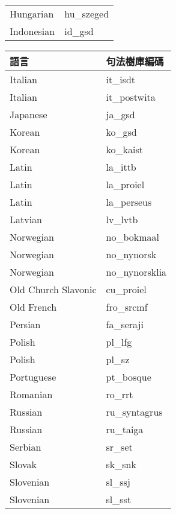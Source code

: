 \begin{table}[h!]
\begin{subtable}[t]{.5\textwidth}
\begin{tabular}[t]{|l l|}
        Hungarian & hu\_szeged \\
        Indonesian & id\_gsd \\
        \hline
    \end{tabular}
\end{subtable}%
\begin{subtable}[t]{.5\textwidth}
    \begin{tabular}[t]{|l l|}
        \hline
        \textbf{語言} & \textbf{句法樹庫編碼} \\
        \hline
        Italian & it\_isdt \\
        Italian & it\_postwita \\
        Japanese & ja\_gsd \\
        Korean & ko\_gsd \\
        Korean & ko\_kaist \\
        Latin & la\_ittb \\
        Latin & la\_proiel \\
        Latin & la\_perseus \\
        Latvian & lv\_lvtb \\
        Norwegian & no\_bokmaal \\
        Norwegian & no\_nynorsk \\
        Norwegian & no\_nynorsklia \\
        Old Church Slavonic & cu\_proiel \\
        Old French & fro\_srcmf \\
        Persian & fa\_seraji \\
        Polish & pl\_lfg \\
        Polish & pl\_sz \\
        Portuguese & pt\_bosque \\
        Romanian & ro\_rrt \\
        Russian & ru\_syntagrus \\
        Russian & ru\_taiga \\
        Serbian & sr\_set \\
        Slovak & sk\_snk \\
        Slovenian & sl\_ssj \\
        Slovenian & sl\_sst \\

\end{tabular}
\end{subtable}
\end{table}
